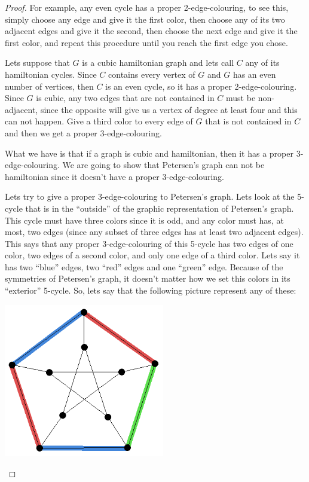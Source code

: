\begin{proof}
        For example, any even cycle has a proper 2-edge-colouring, to see this, simply choose any edge and give it the first color, 
        then choose any of its two adjacent edges and give it the second, then choose the next edge and give it the first color, and 
        repeat this procedure until you reach the first edge you chose.\pn
            
        Lets suppose that $G$ is a cubic hamiltonian graph and lets call $C$ any of its hamiltonian cycles. Since $C$ contains every 
        vertex of $G$ and $G$ has an even number of vertices, then $C$ is an even cycle, so it has a proper 2-edge-colouring. Since 
        $G$ is cubic, any two edges that are not contained in $C$ must be non-adjacent, since the opposite will give us a vertex of
        degree at least four and this can not happen. Give a third color to every edge of $G$ that is not contained in $C$ and then
        we get a proper 3-edge-colouring.\pn
        
        What we have is that if a graph is cubic and hamiltonian, then it has a proper 3-edge-colouring. We are going to show that
        Petersen's graph can not be hamiltonian since it doesn't have a proper 3-edge-colouring.\pn
        
        Lets try to give a proper 3-edge-colouring to Petersen's graph. Lets look at the 5-cycle that is in the ``outside'' of 
        the graphic representation of Petersen's graph. This cycle must have three colors since it is odd, and any color must has, at most,
        two edges (since any subset of three edges has at least two adjacent edges). This says that any proper 3-edge-colouring of
        this 5-cycle has two edges of one color, two edges of a second color, and only one edge of a third color. Lets say it has
        two ``blue'' edges, two ``red'' edges and one ``green'' edge. Because of the symmetries of Petersen's graph, it doesn't matter
        how we set this colors in its ``exterior'' 5-cycle. So, lets say that the following picture represent any of these:
        \begin{center}
            \includegraphics[width=7cm]{PetersenIsNotHamiltonian/Petersen2.png}    
        \end{center}\pn
        

\end{proof}
